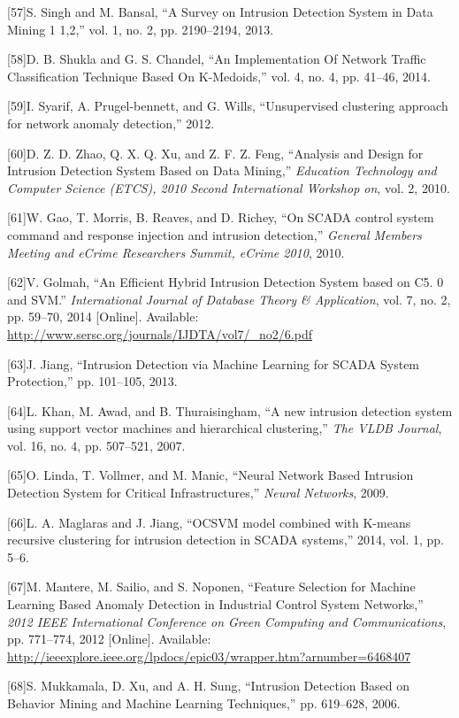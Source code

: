 \documentclass[11pt,a4paper]{article}
\begin{document}
{[}57{]}S. Singh and M. Bansal, ``A Survey on Intrusion Detection System
in Data Mining 1 1,2,'' vol. 1, no. 2, pp. 2190--2194, 2013.

{[}58{]}D. B. Shukla and G. S. Chandel, ``An Implementation Of Network
Traffic Classification Technique Based On K-Medoids,'' vol. 4, no. 4,
pp. 41--46, 2014.

{[}59{]}I. Syarif, A. Prugel-bennett, and G. Wills, ``Unsupervised
clustering approach for network anomaly detection,'' 2012.

{[}60{]}D. Z. D. Zhao, Q. X. Q. Xu, and Z. F. Z. Feng, ``Analysis and
Design for Intrusion Detection System Based on Data Mining,''
\emph{Education Technology and Computer Science (ETCS), 2010 Second
International Workshop on}, vol. 2, 2010.

{[}61{]}W. Gao, T. Morris, B. Reaves, and D. Richey, ``On SCADA control
system command and response injection and intrusion detection,''
\emph{General Members Meeting and eCrime Researchers Summit, eCrime
2010}, 2010.

{[}62{]}V. Golmah, ``An Efficient Hybrid Intrusion Detection System
based on C5. 0 and SVM.'' \emph{International Journal of Database Theory
\& Application}, vol. 7, no. 2, pp. 59--70, 2014 {[}Online{]}.
Available: \url{http://www.sersc.org/journals/IJDTA/vol7/_no2/6.pdf}

{[}63{]}J. Jiang, ``Intrusion Detection via Machine Learning for SCADA
System Protection,'' pp. 101--105, 2013.

{[}64{]}L. Khan, M. Awad, and B. Thuraisingham, ``A new intrusion
detection system using support vector machines and hierarchical
clustering,'' \emph{The VLDB Journal}, vol. 16, no. 4, pp. 507--521,
2007.

{[}65{]}O. Linda, T. Vollmer, and M. Manic, ``Neural Network Based
Intrusion Detection System for Critical Infrastructures,'' \emph{Neural
Networks}, 2009.

{[}66{]}L. A. Maglaras and J. Jiang, ``OCSVM model combined with K-means
recursive clustering for intrusion detection in SCADA systems,'' 2014,
vol. 1, pp. 5--6.

{[}67{]}M. Mantere, M. Sailio, and S. Noponen, ``Feature Selection for
Machine Learning Based Anomaly Detection in Industrial Control System
Networks,'' \emph{2012 IEEE International Conference on Green Computing
and Communications}, pp. 771--774, 2012 {[}Online{]}. Available:
\url{http://ieeexplore.ieee.org/lpdocs/epic03/wrapper.htm?arnumber=6468407}

{[}68{]}S. Mukkamala, D. Xu, and A. H. Sung, ``Intrusion Detection Based
on Behavior Mining and Machine Learning Techniques,'' pp. 619--628,
2006.
\end{document}
